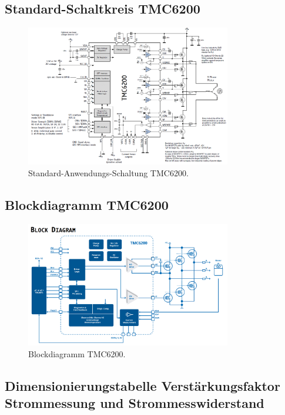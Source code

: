 \begin{appendix}
\subsection{Standard-Schaltkreis TMC6200}

\begin{figure}[h!]
	\centering
	\includegraphics[width=0.8\textwidth]{graphics/Standard_Application_Cirquit_TMC6200.png}
	\caption{Standard-Anwendungs-Schaltung TMC6200.}
	\label{fig:Schaltung_TMC6200}
\end{figure}

\subsection{Blockdiagramm TMC6200}

\begin{figure}[h!]
	\centering
	\includegraphics[width=0.8\textwidth]{graphics/Blockdiagramm_TMC6200.png}
	\caption{Blockdiagramm TMC6200.}
	\label{fig:Blockdiagramm_TMC6200}
\end{figure}

\newpage

\subsection{Dimensionierungstabelle Verstärkungsfaktor Strommessung und Strommesswiderstand}


\end{appendix}
